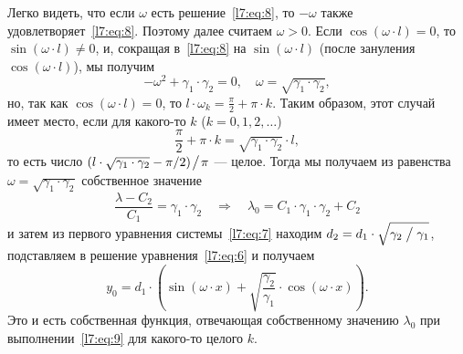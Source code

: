 Легко видеть, что если $\omega$ есть решение~\eqref{l7:eq:8}, то $-\omega$ также удовлетворяет~\eqref{l7:eq:8}. Поэтому далее считаем $\omega>0$. Если $\cos(\omega\cdot l)=0$, то $\sin(\omega\cdot l)\neq0${\mb,} и{\mb,} сокращая в~\eqref{l7:eq:8} на $\sin(\omega\cdot l)$ (после зануления $\cos(\omega\cdot l)$){\mb,} мы получим 
\begin{equation*}
	-\omega^2+\gamma_1\cdot\gamma_2=0,\quad\omega=\sqrt{\gamma_1\cdot\gamma_2},
\end{equation*}
но{\mb,} так как $\cos(\omega\cdot l)=0$, то $l\cdot\omega_k=\displaystyle\frac{\pi}{2}+\pi\cdot k$. Таким образом{\mb,} этот случай имеет место, если для какого-то $k$ ($k=0,1,2,\ldots$)
\begin{equation}
	\label{l7:eq:9}
	\frac{\pi}{2}+\pi\cdot k=\sqrt{\gamma_1\cdot\gamma_2}\cdot l,
\end{equation} 
то есть число $(l\cdot\sqrt{\gamma_1\cdot\gamma_2}-\pi/2)\!\bigm/\!\pi$ --- целое.  Тогда мы получаем из равенства $\omega=\sqrt{\gamma_1\cdot\gamma_2}$ собственное значение 
\begin{equation*}
	\frac{\lambda-C_2}{C_1}=\gamma_1\cdot\gamma_2\quad\Rightarrow\quad\lambda_0=C_1\cdot\gamma_1\cdot\gamma_2+C_2
\end{equation*}
и затем из первого уравнения системы~\eqref{l7:eq:7} находим $d_2=d_1\cdot\sqrt{\gamma_2\bigm/\gamma_1}$, подставляем в решение уравнения~\eqref{l7:eq:6} и получаем 
\begin{equation*}
	 y_0=d_1\cdot\left(\sin(\omega\cdot x)+\sqrt{\frac{\gamma_2}{\gamma_1}}\cdot\cos(\omega\cdot x)\right).
\end{equation*}
Это и есть собственная функция, отвечающая собственному значению $\lambda_0$ при выполнении~\eqref{l7:eq:9} для какого-то целого $k$. 

